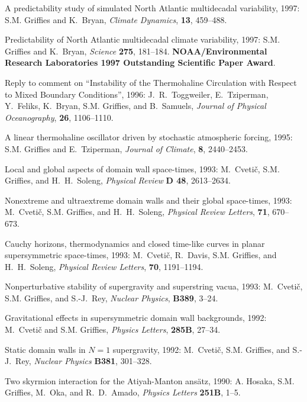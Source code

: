 \begin{etaremune}
\item A predictability study of simulated North Atlantic multidecadal
variability, 1997: S.M. Grif\/f\/ies and K.\ Bryan, {\em
Climate Dynamics}, {\bf 13}, 459--488.
  
\item Predictability of North Atlantic multidecadal climate
  variability, 1997: S.M. Grif\/f\/ies and K.\ Bryan, {\em
    Science} {\bf 275}, 181--184. {\bf NOAA/Environmental
    Research Laboratories 1997 Outstanding Scientific Paper Award}.
 
\item Reply to comment on ``Instability of the Thermohaline
Circulation with Respect to Mixed Boundary Conditions'', 1996: J.\ R.\
Toggweiler, E.\ Tziperman, Y.\ Feliks, K.\ Bryan, S.M. Grif\/f\/ies, and B.\ Samuels, {\em Journal of Physical
Oceanography}, {\bf 26}, 1106--1110.
  
\item A linear thermohaline oscillator driven by stochastic
atmospheric forcing, 1995: S.M. Grif\/f\/ies and E.\ Tziperman,
{\em Journal of Climate}, {\bf 8}, 2440--2453.

\item Local and global aspects of domain wall space-times, 1993: M.\
Cveti\v c, S.M. Grif\/f\/ies, and H.\ H.\ Soleng, {\em Physical
Review} {\bf D 48}, 2613--2634.

\item Nonextreme and ultraextreme domain walls and their global
space-times, 1993: M.\ Cveti\v c, S.M. Grif\/f\/ies, and H.\
H.\ Soleng, {\em Physical Review Letters}, {\bf 71}, 670--673.

\item Cauchy horizons, thermodynamics and closed time-like curves in planar supersymmetric space-times, 1993: M.\ Cveti\v c, R.\ Davis, S.M. Grif\/f\/ies, and H.\ H.\ Soleng, {\em Physical Review
Letters}, {\bf 70}, 1191--1194.
                                                                 
\item Nonperturbative stability of supergravity and superstring vacua, 1993: M.\ Cveti\v c, S.M. Grif\/f\/ies, and S.-J.\ Rey, {\em Nuclear Physics}, {\bf B389}, 3--24.
 
\item Gravitational effects in supersymmetric domain wall backgrounds, 1992: M.\ Cveti\v c and S.M. Grif\/f\/ies, {\em Physics Letters}, {\bf 285B}, 27--34.

\item Static domain walls in $N=1$ supergravity, 1992: M.\ Cveti\v
c, S.M. Grif\/f\/ies, and S.-J.\ Rey, {\em Nuclear Physics}
{\bf B381}, 301--328.

\item Two skyrmion interaction for the Atiyah-Manton ans\"atz, 1990: 
A. Hosaka, S.M. Grif\/f\/ies, M.\ Oka, and R.\ D.\ Amado, {\it Physics Letters} {\bf 251B}, 1--5.


\end{etaremune}

